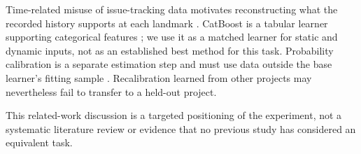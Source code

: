 Time-related misuse of issue-tracking data motivates reconstructing what the recorded history supports at each landmark \cite{tu2018careful}. CatBoost is a tabular learner supporting categorical features \cite{prokhorenkova2018catboost}; we use it as a matched learner for static and dynamic inputs, not as an established best method for this task. Probability calibration is a separate estimation step and must use data outside the base learner's fitting sample \cite{sklearncalibration}. Recalibration learned from other projects may nevertheless fail to transfer to a held-out project.

This related-work discussion is a targeted positioning of the experiment, not a systematic literature review or evidence that no previous study has considered an equivalent task.
